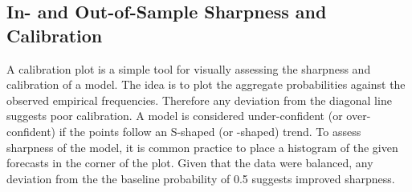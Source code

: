 \documentclass[aoas, preprint]{imsart}
\numberwithin{equation}{section}
\theoremstyle{plain}
\begin{document}



\subsection{In- and Out-of-Sample Sharpness and Calibration}
\label{calibration}
A calibration plot is a simple tool for visually assessing the sharpness and calibration of a model. The idea is to plot the aggregate probabilities against the observed empirical frequencies. Therefore any deviation from the diagonal line suggests poor calibration. A model is considered under-confident (or over-confident) if the points follow an S-shaped (or -shaped) trend. To assess sharpness of the model, it is common practice to place a histogram of the given forecasts in the corner of the plot. Given that the data were balanced, any deviation from the the baseline probability of 0.5 suggests improved sharpness.
\end{document}
